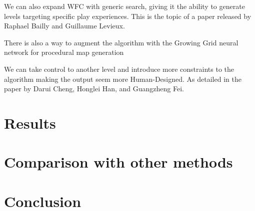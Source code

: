 \documentclass[10pt,twoside,a4paper]{article}
\begin{document}
We can also expand WFC with generic search, giving it the ability to generate levels targeting specific play experiences.
This is the topic of a paper released by Raphael Bailly and Guillaume Levieux\cite{BL22}.

There is also a way to augment the algorithm with the Growing Grid neural network for procedural map generation \cite{NMBP20}

We can take control to another level and introduce more constraints to the algorithm making the output seem more Human-Designed.
As detailed in the paper by Darui Cheng, Honglei Han, and Guangzheng Fei\cite{CHF20}.

\section{Results}\label{sec:results}
\section{Comparison with other methods}\label{sec:comparison}
\section{Conclusion}\label{sec:conclusion}


\end{document}
